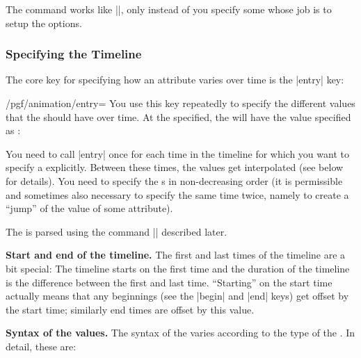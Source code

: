 \begin{command}{\pgfanimateattributecode{}}
  The command works like |\pgfanimateattribute|, only instead of
   you specify some  whose job is to setup
  the options. 
\end{command}


\subsubsection{Specifying the Timeline}

The core key for specifying how an attribute varies over time is the
|entry| key:
\begin{key}{/pgf/animation/entry=}
  You use this key repeatedly to specify the different values that
  the  should have over time. At the 
  specified, the  will have the value specified as
  :
  
\begin{codeexample}[]
\end{codeexample}

  You need to call |entry| once for each time in the timeline for
  which you want to specify a  explicitly. Between these
  times, the values get interpolated (see below for details). You need
  to specify the s in non-decreasing order (it is
  permissible and sometimes also necessary to specify the same time
  twice, namely to create a ``jump'' of the value of some attribute).

  The  is parsed using the command |\pgfparsetime|
  described later.

  \medskip
  \textbf{Start and end of the timeline.}
  The first and last times of the timeline are a bit special: The
  timeline starts on the first time and the duration of the timeline is
  the difference between the first and last time. ``Starting'' on the
  start time actually means that any beginnings (see the |begin| and
  |end| keys) get offset by the start time; similarly end times are
  offset by this value. 

  \medskip
  \textbf{Syntax of the values.}
  The syntax of the  varies according to the type of the
  . In detail, these are:


\end{key}
